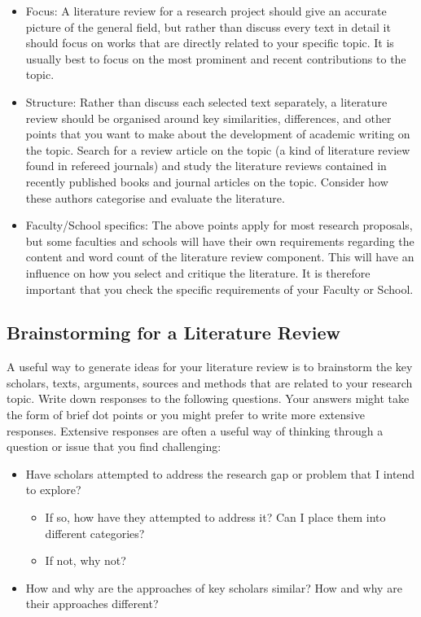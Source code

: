 \documentclass[12pt, a4paper]{article}
\begin{document}
\begin{itemize}
\item Focus: A literature review for a research project should give an accurate picture of the general field, but rather than discuss every text in detail it should focus on works that are directly related to your specific topic. It is usually best to focus on the most prominent and recent contributions to the topic.
\item Structure: Rather than discuss each selected text separately, a literature review should be organised around key similarities, differences, and other points that you want to make about the development of academic writing on the topic. Search for a review article on the topic (a kind of literature review found in refereed journals) and study the literature reviews contained in recently published books and journal articles on the topic. Consider how these authors categorise and evaluate the literature.
\item Faculty/School specifics: The above points apply for most research proposals, but some faculties and schools will have their own requirements regarding the content and word count of the literature review component. This will have an influence on how you select and critique the literature. It is therefore important that you check the specific requirements of your Faculty or School.
\end{itemize}

\subsection{Brainstorming for a Literature Review}
A useful way to generate ideas for your literature review is to brainstorm the key scholars, texts, arguments, sources and methods that are related to your research topic. Write down responses to the following questions. Your answers might take the form of brief dot points or you might prefer to write more extensive responses. Extensive responses are often a useful way of thinking through a question or issue that you find challenging:
\begin{itemize}
\item Have scholars attempted to address the research gap or problem that I intend to explore?
	\begin{itemize}
		\item If so, how have they attempted to address it? Can I place them into different categories?
		\item If not, why not?
	\end{itemize}
\item How and why are the approaches of key scholars similar? How and why are their approaches different?
\end{itemize}
\end{document}
